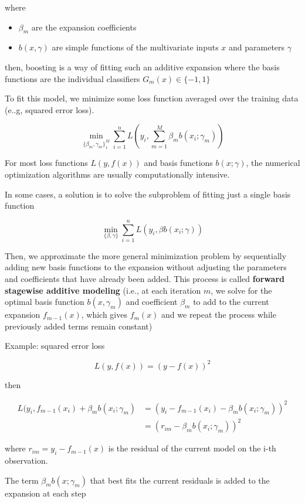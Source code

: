 \documentclass[
]{book}
\begin{document}
where

\begin{itemize}
\item
  \(\beta_m\) are the expansion coefficients
\item
  \(b(x, \gamma)\) are simple functions of the multivariate inputs \(x\) and parameters \(\gamma\)
\end{itemize}

then, boosting is a way of fitting such an additive expansion where the basis functions are the individual classifiers \(G_m(x) \in \{ -1, 1\}\)

To fit this model, we minimize some loss function averaged over the training data (e..g, squared error loss).

\[
\min_{\{\beta_m , \gamma_m \}^M_1} \sum_{i=1}^n L (y_i, \sum_{m=1}^M  \beta_m b(x_i; \gamma_m))
\]

For most loss functions \(L(y, f(x))\) and basis functions \(b(x; \gamma)\), the numerical optimization algorithms are usually computationally intensive.

In some cases, a solution is to solve the subproblem of fitting just a single basis function

\[
\min_{\{\beta, \gamma\}} \sum_{i=1}^n L(y_i, \beta b (x_i; \gamma))
\]

Then, we approximate the more general minimization problem by sequentially adding new basis functions to the expansion without adjusting the parameters and coefficients that have already been added. This process is called \textbf{forward stagewise additive modeling} (i.e., at each iteration \(m\), we solve for the optimal basis function \(b(x, \gamma_m)\) and coefficient \(\beta_m\) to add to the current expansion \(f_{m-1}(x)\), which gives \(f_m(x)\) and we repeat the process while previously added terms remain constant)

Example: squared error loss

\[
L(y, f(x)) = (y - f(x))^2
\]

then

\[
\begin{aligned}
L(y_i, f_{m-1}(x_i) + \beta_m b(x_i; \gamma_m) &= (y_i - f_{m-1}(x_i) - \beta_mb(x_i; \gamma_m))^2 \\
&= (r_{im} - \beta_mb(x_i; \gamma_m))^2
\end{aligned}
\]

where \(r_{im} = y_i - f_{m-1}(x)\) is the residual of the current model on the i-th observation.

The term \(\beta_m b(x; \gamma_m)\) that best fits the current residuals is added to the expansion at each step
\end{document}
